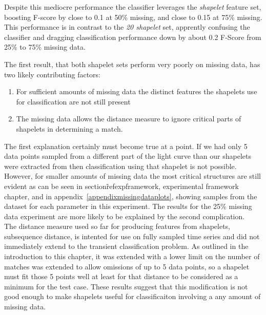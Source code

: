 Despite this mediocre performance the classifier leverages the \emph{shapelet} feature set, boosting F-score by close to 0.1 at 50\% missing, and close to 0.15 at 75\% missing. This performance is in contrast to the \emph{20 shapelet} set, apprently confusing the classifier and dragging classification performance down by about 0.2 F-Score from 25\% to 75\% missing data.

The first result, that both shapelet sets perform very poorly on missing data, has two likely contributing factors:
\begin{enumerate}
	\item For sufficient amounts of missing data the distinct features the shapelets use for classification are not still present
	\item The missing data allows the distance measure to ignore critical parts of shapelets in determining a match. \end{enumerate}
%

The first explanation certainly must become true at a point. If we had only 5 data points sampled from a different part of the light curve than our shapelets were extracted from then classification using that shapelet is not possible. However, for smaller amounts of missing data the most critical structures are still evident as can be seen in section\~ref{expframework}, experimental framework chapter, and in appendix~\ref{appendixmissingdataplots}, showing samples from the dataset for each parameter in this experiment. The results for the 25\% missing data experiment are more likely to be explained by the second complication. \\

The distance measure used so far for producing features from shapelets, subsequence distance, is intented for use on fully sampled time series and did not immediately extend to the transient classification problem. As outlined in the introduction to this chapter, it was extended with a lower limit on the number of matches  was extended to allow omissions of up to 5 data points, so a shapelet must fit those 5 points well at least for that distance to be considered as a minimum for the test case. These results suggest that this modification is not good enough to make shapelets useful for classificaiton involving a any amount of missing data.

